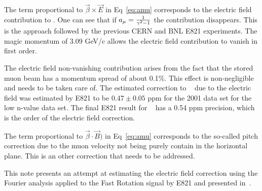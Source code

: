 The term proportional to ${\vec \beta \times \vec E }$ in Eq~\ref{eq:amu} corresponds to the electric field contribution to \wa.
One can see that if $a_{\mu} = {1 \over \gamma^2 - 1}$ the contribution disappears. 
This is the approach followed by the previous CERN and BNL E821 experiments. 
The magic momentum of 3.09 GeV/c allows the electric field contribution to vanish in first order.

The electric field non-vanishing contribution arises from the fact that the stored muon beam has a momentum spread of about 0.1\%.
This effect is non-negligible and needs to be taken care of. The estimated correction to \wa~ due to the electric field was estimated
by E821 to be $0.47 \pm 0.05$ ppm for the 2001 data set for the low n-value data set. The final E821 result for \amu~ has a 0.54 ppm precision, which
is the order of the electric field correction.

The term proportional to $\vec \beta \cdot \vec B)$ in Eq~\ref{eq:amu} corresponds to the so-called pitch correction due to the muon velocity not
being purely contain in the horizontal plane. This is an other correction that needs to be addressed.

This note presents an attempt at estimating the electric field correction using the Fourier analysis applied to the Fast Rotation signal by E821 and presented in~\cite{orlov}.
